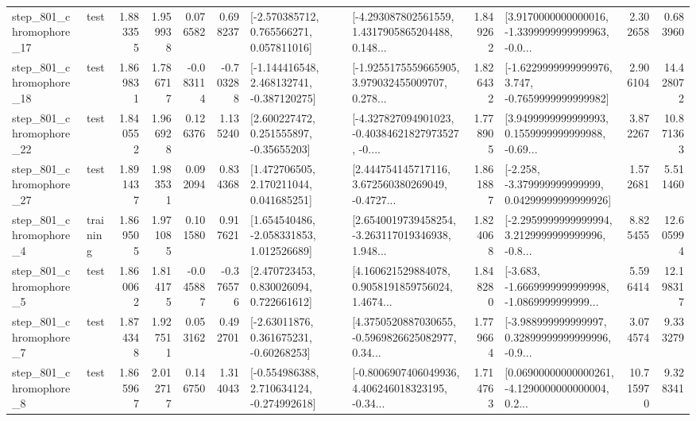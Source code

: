 \begin{tabular}{llrrrrllrlrr}
  step\_801\_chromophore\_17 &      test &      1.883355 &    1.959938 &      0.076582 &  0.698237 &    [-2.570385712, 0.765566271, 0.057811016] &  [-4.293087802561559, 1.4317905865204488, 0.148... &       1.849262 &  [3.9170000000000016, -1.3399999999999963, -0.0... &            2.302658 &          0.683960 \\
  step\_801\_chromophore\_18 &      test &      1.869831 &    1.786717 &     -0.083114 & -0.703288 &   [-1.144416548, 2.468132741, -0.387120275] &  [-1.9255175559665905, 3.979032455009707, 0.278... &       1.826432 &  [-1.6229999999999976, 3.747, -0.7659999999999982] &            2.906104 &         14.428072 \\
  step\_801\_chromophore\_22 &      test &      1.840552 &    1.966928 &      0.126376 &  1.135240 &     [2.600227472, 0.251555897, -0.35655203] &  [-4.327827094901023, -0.40384621827973527, -0.... &       1.778905 &  [3.9499999999999993, 0.1559999999999988, -0.69... &            3.872267 &         10.871363 \\
  step\_801\_chromophore\_27 &      test &      1.891437 &    1.983531 &      0.092094 &  0.834368 &     [1.472706505, 2.170211044, 0.041685251] &  [2.444754145717116, 3.672560380269049, -0.4727... &       1.861887 &  [-2.258, -3.379999999999999, 0.04299999999999926] &            1.572681 &          5.511460 \\
   step\_801\_chromophore\_4 &  training &      1.869505 &    1.971085 &      0.101580 &  0.917621 &    [1.654540486, -2.058331853, 1.012526689] &  [2.6540019739458254, -3.263117019346938, 1.948... &       1.824068 &  [-2.2959999999999994, 3.2129999999999996, -0.8... &            8.825455 &         12.605994 \\
   step\_801\_chromophore\_5 &      test &      1.860062 &    1.814175 &     -0.045887 & -0.376576 &     [2.470723453, 0.830026094, 0.722661612] &  [4.160621529884078, 0.9058191859756024, 1.4674... &       1.848280 &  [-3.683, -1.6669999999999998, -1.0869999999999... &            5.596414 &         12.198317 \\
   step\_801\_chromophore\_7 &      test &      1.874348 &    1.927511 &      0.053162 &  0.492701 &     [-2.63011876, 0.361675231, -0.60268253] &  [4.3750520887030655, -0.5969826625082977, 0.34... &       1.779664 &  [-3.988999999999997, 0.32899999999999996, -0.9... &            3.074574 &          9.333279 \\
   step\_801\_chromophore\_8 &      test &      1.865967 &    2.012717 &      0.146750 &  1.314043 &   [-0.554986388, 2.710634124, -0.274992618] &  [-0.8006907406049936, 4.406246018323195, -0.34... &       1.714763 &  [0.06900000000000261, -4.1290000000000004, 0.2... &           10.715970 &          9.328341 \\

\end{tabular}
